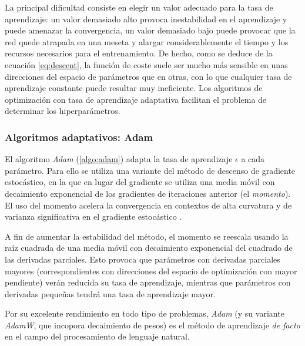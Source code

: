 La principal dificultad consiste en elegir un valor adecuado para la tasa de aprendizaje: un valor demasiado alto provoca inestabilidad en el aprendizaje y puede amenazar la convergencia, un valor demasiado bajo puede provocar que la red quede atrapada en una meseta y alargar considerablemente el tiempo y los recursos necesarios para el entrenamiento. De hecho, como se deduce de la ecuación \eqref{eq:descent}, la función de coste suele ser mucho más sensible en unas direcciones del espacio de parámetros que en otras, con lo que cualquier tasa de aprendizaje constante puede resultar muy ineficiente. Los algoritmos de optimización con tasa de aprendizaje adaptativa facilitan el problema de determinar los hiperparámetros.

\subsubsection{Algoritmos adaptativos: Adam}
El algoritmo \textit{Adam} (\cref{algo:adam}) adapta la tasa de aprendizaje \( \epsilon \) a cada parámetro. Para ello se utiliza una variante del método de descenso de gradiente estocástico, en la que en lugar del gradiente se utiliza una media móvil con decaimiento exponencial de los gradientes de iteraciones anterior (el \textit{momento}). El uso del momento acelera la convergencia en contextos de alta curvatura y de varianza significativa en el gradiente estocástico \cite{polyak1964some}.

A fin de aumentar la estabilidad del método, el momento se reescala usando la raíz cuadrada de una media móvil con decaimiento exponencial del cuadrado de las derivadas parciales. Esto provoca que parámetros con derivadas parciales mayores (correspondientes con direcciones del espacio de optimización con mayor pendiente) verán reducida su tasa de aprendizaje, mientras que parámetros con derivadas pequeñas tendrá una tasa de aprendizaje mayor. 

Por su excelente rendimiento en todo tipo de problemas, \textit{Adam} (y su variante \textit{AdamW}, que incopora decaimiento de pesos) es el método de aprendizaje \textit{de facto} en el campo del procesamiento de lenguaje natural.

